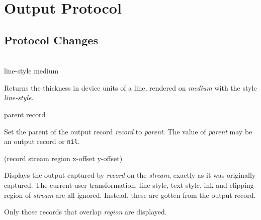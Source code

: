 \chapter{Output Protocol}

\section{Protocol Changes}

 {\\ line-style medium}

Returns the thickness in device units of a line,
rendered on \textit{medium} with the style \textit{line-style}.

 {parent record}

Set the parent of the output record \textit{record}
to \textit{parent}.  The value of \textit{parent} may be an output
record or \texttt{nil}.

{(record stream \optional region x-offset y-offset)}

Displays the output captured by \textit{record} on the
\textit{stream}, exactly as it was originally captured. The current
user transformation, line style, text style, ink and clipping region
of \textit{stream} are all ignored. Instead, these are gotten from the
output record.

Only those records that overlap \textit{region} are displayed.









